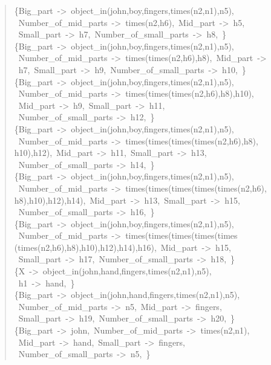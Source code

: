 \begin{quote}
\{Big\_part~->~object\_in(john,boy,fingers,times(n2,n1),n5),\\ ~Number\_of\_mid\_parts~->~times(n2,h6),~Mid\_part~->~h5,\\~Small\_part~->~h7,~Number\_of\_small\_parts~->~h8,~\}\\
\{Big\_part~->~object\_in(john,boy,fingers,times(n2,n1),n5),\\ ~Number\_of\_mid\_parts~->~times(times(n2,h6),h8),~Mid\_part~->\\~h7,~Small\_part~->~h9,~Number\_of\_small\_parts~->~h10,~\}\\
\{Big\_part~->~object\_in(john,boy,fingers,times(n2,n1),n5),\\ ~Number\_of\_mid\_parts~->~times(times(times(n2,h6),h8),h10),\\~Mid\_part~->~h9,~Small\_part~->~h11,\\ ~Number\_of\_small\_parts~->~h12,~\}\\
\{Big\_part~->~object\_in(john,boy,fingers,times(n2,n1),n5),\\ ~Number\_of\_mid\_parts~->~times(times(times(times(n2,h6),h8),\\h10),h12),~Mid\_part~->~h11,~Small\_part~->~h13,\\~Number\_of\_small\_parts~->~h14,~\}\\
\{Big\_part~->~object\_in(john,boy,fingers,times(n2,n1),n5),\\ ~Number\_of\_mid\_parts~->~times(times(times(times(times(n2,h6),\\h8),h10),h12),h14),~Mid\_part~->~h13,~Small\_part~->~h15,\\~Number\_of\_small\_parts~->~h16,~\}\\
\{Big\_part~->~object\_in(john,boy,fingers,times(n2,n1),n5),\\~Number\_of\_mid\_parts~->~times(times(times(times(times\\(times(n2,h6),h8),h10),h12),h14),h16),~Mid\_part~->~h15,\\~Small\_part~->~h17,~Number\_of\_small\_parts~->~h18,~\}\\
\{X~->~object\_in(john,hand,fingers,times(n2,n1),n5),\\ ~h1~->~hand,~\}\\
\{Big\_part~->~object\_in(john,hand,fingers,times(n2,n1),n5),\\ ~Number\_of\_mid\_parts~->~n5,~Mid\_part~->~fingers,\\~Small\_part~->~h19,~Number\_of\_small\_parts~->~h20,~\}\\
\{Big\_part~->~john,~Number\_of\_mid\_parts~->~times(n2,n1),\\ ~Mid\_part~->~hand,~Small\_part~->~fingers,\\~Number\_of\_small\_parts~->~n5,~\}\\

\end{quote}
